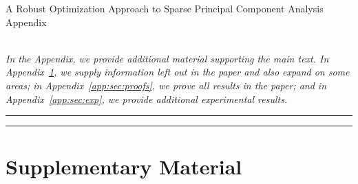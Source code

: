 \documentclass{article}
\begin{document}
{\hypersetup{allcolors=black} %

\begin{center}
    {\LARGE A Robust Optimization Approach to Sparse Principal Component Analysis} \\[0.4cm]
    {\LARGE Appendix} \\[0.5cm]
    {\large {}} \\[0.5cm]
    
    \begin{minipage}{0.9\textwidth}
        \itshape
    In the Appendix, we provide additional material supporting the main text. In Appendix~\ref{app:sec:supp}, we supply information left out in the paper and also expand on some areas; in Appendix~\ref{app:sec:proofs}, we prove all results in the paper; and in Appendix~\ref{app:sec:exp}, we provide additional experimental results.
    \end{minipage}
\end{center}

\vspace{1cm}
\hrule
\vspace{0.3cm}



\begin{center}
\begin{minipage}{0.9\textwidth}
    \etocarticlestyle 
    \tableofcontents 
\end{minipage}
\end{center}

\vspace{0.5cm}
\hrule
\vspace{1cm}

\newpage
}

\setcounter{equation}{0}
\renewcommand{\theequation}{A.\arabic{equation}}
\setcounter{figure}{0}
\renewcommand{\thefigure}{A.\arabic{figure}}

\section{Supplementary Material}\label{app:sec:supp}
\end{document}
